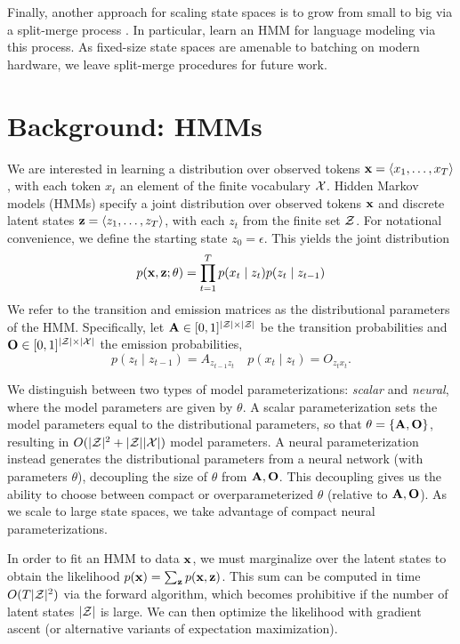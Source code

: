 \documentclass[11pt,a4paper]{article}
\begin{document}
Finally, another approach for scaling state spaces is to
grow from small to big via a split-merge process
\citep{petrov2006splitmerge,huang2011thesis}.
In particular, \citet{huang2011thesis} learn an HMM for language modeling
via this process.
As fixed-size state spaces are amenable to batching on modern hardware,
we leave split-merge procedures for future work. 

\section{Background: HMMs}

We are interested in learning a distribution over observed tokens
$\mathbf{x} = \langle x_1, \ldots, x_T \rangle$, with each token $x_t$
an element of the finite vocabulary $\mathcal{X}$.
Hidden Markov models (HMMs) specify a joint distribution over 
observed tokens $\mathbf{x}$ and discrete latent states $\mathbf{z} = \langle z_1, \ldots, z_T \rangle$,
with each $z_t$ from the finite set $\mathcal{Z}$.
For notational convenience, we define the starting state $z_0=\epsilon$.
This yields the joint distribution
\begin{equation}
p(\mathbf{x}, \mathbf{z}; \theta)
= \prod_{t=1}^T p(x_t\mid z_t)p(z_t \mid z_{t-1})
\end{equation}
\noindent We refer to the transition and emission matrices as the distributional parameters of the HMM.
Specifically, let $\mathbf{A} \in[0,1]^{|\mathcal{Z}|\times|\mathcal{Z}|}$ be the transition probabilities and
$\mathbf{O} \in[0,1]^{|\mathcal{Z}|\times|\mathcal{X}|}$ the emission probabilities,
\begin{equation}
p(z_t \mid z_{t-1}) = A_{z_{t-1}z_t}  \quad
p(x_t \mid z_t) = O_{z_tx_t}.
\end{equation}

We distinguish between two types of model parameterizations: \textit{scalar} and \textit{neural},
where the model parameters are given by $\theta$.
A scalar parameterization sets the model parameters equal to the distributional
parameters, so that $\theta = \left\{\mathbf{A}, \mathbf{O}\right\}$,
resulting in $O(|\mathcal{Z}|^2 + |\mathcal{Z}||\mathcal{X}|)$ model parameters.
A neural parameterization instead generates the distributional parameters
from a neural network (with parameters $\theta$),
decoupling the size of $\theta$ from $\mathbf{A},\mathbf{O}$.
This decoupling gives us the ability to choose
between compact or overparameterized $\theta$ (relative to $\mathbf{A},\mathbf{O}$).
As we scale to large state spaces,
we take advantage of compact neural parameterizations.

In order to fit an HMM to data $\mathbf{x}$,
we must marginalize over the latent states to obtain the likelihood
$p(\mathbf{x}) = \sum_{\mathbf{z}}p(\mathbf{x},\mathbf{z})$.
This sum can be computed in time $O(T|\mathcal{Z}|^2)$ via the forward algorithm,
which becomes prohibitive if the number of latent states $|\mathcal{Z}|$ is large.
We can then optimize the likelihood 
with gradient ascent (or alternative variants of expectation maximization).
\end{document}
